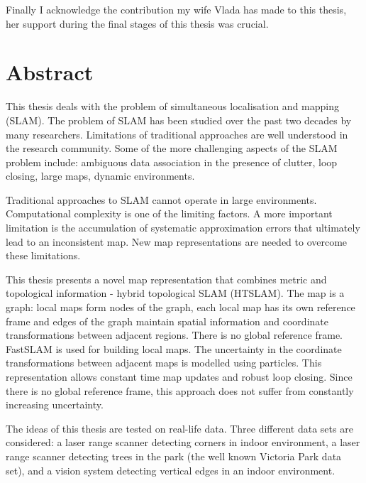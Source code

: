 \documentclass[11pt,onecolum,a4paper,oneside]{book}
\begin{document}
Finally I acknowledge the contribution my wife Vlada has made to this
thesis, her support during the final stages of this thesis was
crucial.







\chapter*{Abstract}  %

This thesis deals with the problem of simultaneous localisation and
mapping (SLAM). The problem of SLAM has been studied over the past two
decades by many researchers. Limitations of traditional approaches are
well understood in the research community. Some of the more
challenging aspects of the SLAM problem include: ambiguous data
association in the presence of clutter, loop closing, large maps,
dynamic environments.

Traditional approaches to SLAM cannot operate in large environments.
Computational complexity is one of the limiting factors. A more
important limitation is the accumulation of systematic approximation
errors that ultimately lead to an inconsistent map. New map
representations are needed to overcome these limitations.

This thesis presents a novel map representation that combines metric
and topological information - hybrid topological SLAM (HTSLAM). The
map is a graph: local maps form nodes of the graph, each local map has
its own reference frame and edges of the graph maintain spatial
information and coordinate transformations between adjacent
regions. There is no global reference frame. FastSLAM is used for
building local maps. The uncertainty in the coordinate transformations
between adjacent maps is modelled using particles. This representation
allows constant time map updates and robust loop closing. Since there
is no global reference frame, this approach does not suffer from
constantly increasing uncertainty.

The ideas of this thesis are tested on real-life data. Three different
data sets are considered: a laser range scanner detecting corners in
indoor environment, a laser range scanner detecting trees in the park
(the well known Victoria Park data set), and a vision system detecting
vertical edges in an indoor environment.
\end{document}
